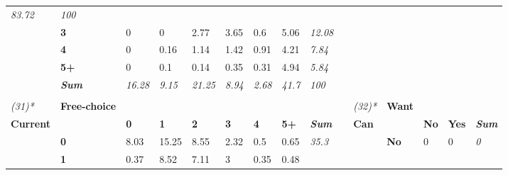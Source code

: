 \begin{table}
{\begin{threeparttable}
\begin{tabular}{lllllllllllllll}
  \textit{83.72} &
  \textit{100} \\
 &
  \textbf{3} &
  \cellcolor[HTML]{FFFFFF}0 &
  \cellcolor[HTML]{FFFFFF}0 &
  \cellcolor[HTML]{F0F0F0}2.77 &
  \cellcolor[HTML]{ECECEC}3.65 &
  \cellcolor[HTML]{FCFCFC}0.6 &
  \cellcolor[HTML]{E4E4E4}5.06 &
  \textit{12.08} &
   &
   &
   &
   &
   &
  \textit{} \\
 &
  \textbf{4} &
  \cellcolor[HTML]{FFFFFF}0 &
  \cellcolor[HTML]{FFFFFF}0.16 &
  \cellcolor[HTML]{F9F9F9}1.14 &
  \cellcolor[HTML]{F8F8F8}1.42 &
  \cellcolor[HTML]{FBFBFB}0.91 &
  \cellcolor[HTML]{E8E8E8}4.21 &
  \textit{7.84} &
   &
   &
   &
   &
   &
  \textit{} \\
 &
  \textbf{5+} &
  \cellcolor[HTML]{FFFFFF}0 &
  \cellcolor[HTML]{FFFFFF}0.1 &
  \cellcolor[HTML]{FFFFFF}0.14 &
  \cellcolor[HTML]{FEFEFE}0.35 &
  \cellcolor[HTML]{FEFEFE}0.31 &
  \cellcolor[HTML]{E4E4E4}4.94 &
  \textit{5.84} &
   &
   &
   &
   &
   &
  \textit{} \\
\textit{} &
  \textit{\textbf{Sum}} &
  \textit{16.28} &
  \textit{9.15} &
  \textit{21.25} &
  \textit{8.94} &
  \textit{2.68} &
  \textit{41.7} &
  \textit{100} &
  \textit{} &
  \textit{} &
  \textit{} &
  \textit{} &
  \textit{} &
  \textit{} \\
\textit{} &
  \textit{\textbf{}} &
  \textit{} &
  \textit{} &
  \textit{} &
  \textit{} &
  \textit{} &
  \textit{} &
  \textit{} &
  \textit{} &
  \textit{} &
  \textit{} &
  \textit{} &
  \textit{} &
  \textit{} \\
\textit{(31)*} &
  \textbf{Free-choice} &
   &
   &
   &
   &
   &
   &
  \textit{} &
   &
  \textit{(32)*} &
  \textbf{Want} &
   &
   &
  \textit{} \\
\textbf{Current} &
   &
  \textbf{0} &
  \textbf{1} &
  \textbf{2} &
  \textbf{3} &
  \textbf{4} &
  \textbf{5+} &
  \textit{\textbf{Sum}} &
  \textbf{} &
  \textbf{Can} &
   &
  \textbf{No} &
  \textbf{Yes} &
  \textit{\textbf{Sum}} \\
 &
  \textbf{0} &
  \cellcolor[HTML]{D1D1D1}8.03 &
  \cellcolor[HTML]{A6A6A6}15.25 &
  \cellcolor[HTML]{CECECE}8.55 &
  \cellcolor[HTML]{F2F2F2}2.32 &
  \cellcolor[HTML]{FDFDFD}0.5 &
  \cellcolor[HTML]{FCFCFC}0.65 &
  \textit{35.3} &
   &
   &
  \textbf{No} &
  \cellcolor[HTML]{FFFFFF}0 &
  \cellcolor[HTML]{FFFFFF}0 &
  \textit{0} \\
 &
  \textbf{1} &
  \cellcolor[HTML]{FDFDFD}0.37 &
  \cellcolor[HTML]{CECECE}8.52 &
  \cellcolor[HTML]{D6D6D6}7.11 &
  \cellcolor[HTML]{EEEEEE}3 &
  \cellcolor[HTML]{FDFDFD}0.35 &
  \cellcolor[HTML]{FDFDFD}0.48 &

\end{tabular}
\end{threeparttable}}
\end{table}

